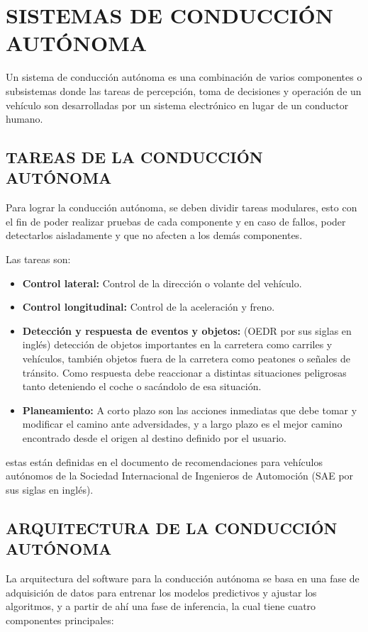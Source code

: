 \section{SISTEMAS DE CONDUCCIÓN AUTÓNOMA}
    Un sistema de conducción autónoma es una combinación de varios componentes o subsistemas donde las tareas de percepción, toma de decisiones y operación de un vehículo son desarrolladas por un sistema electrónico en lugar de un conductor humano.
    
    \subsection{TAREAS DE LA CONDUCCIÓN AUTÓNOMA}
    Para lograr la conducción autónoma, se deben dividir tareas modulares, esto con el fin de poder realizar pruebas de cada componente y en caso de fallos, poder detectarlos aisladamente y que no afecten a los demás componentes.
    
    Las tareas son:
    \begin{itemize}[nosep]
        \item \textbf{Control lateral:} Control de la dirección o volante del vehículo.
        \item \textbf{Control longitudinal:} Control de la aceleración y freno.
        \item \textbf{Detección y respuesta de eventos y objetos:} (OEDR por sus siglas en inglés) detección de objetos importantes en la carretera como carriles y vehículos, también objetos fuera de la carretera como peatones o señales de tránsito. Como respuesta debe reaccionar a distintas situaciones peligrosas tanto deteniendo el coche o sacándolo de esa situación.
        \item \textbf{Planeamiento:} A corto plazo son las acciones inmediatas que debe tomar y modificar el camino ante adversidades, y a largo plazo es el mejor camino encontrado desde el origen al destino definido por el usuario.
    \end{itemize}
    estas están definidas en el documento de recomendaciones para vehículos autónomos de la Sociedad Internacional de Ingenieros de Automoción (SAE por sus siglas en inglés). \citep{J3016_201806}
    \subsection{ARQUITECTURA DE LA CONDUCCIÓN AUTÓNOMA}
    La arquitectura del software para la conducción autónoma se basa en una fase de adquisición de datos para entrenar los modelos predictivos y ajustar los algoritmos, y a partir de ahí una fase de inferencia, la cual tiene cuatro componentes principales:
    
